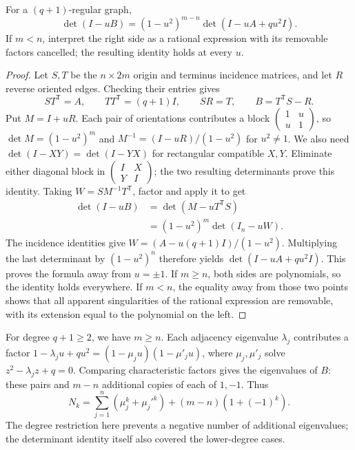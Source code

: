 \begin{theorem}\label{thm:bass}
For a $(q+1)$-regular graph,
\[
\det(I-uB)=(1-u^2)^{m-n}\det(I-uA+qu^2I).
\]
If $m<n$, interpret the right side as a rational expression with its removable factors cancelled; the resulting identity holds at every $u$.
\end{theorem}
\begin{proof}
Let $S,T$ be the $n\times2m$ origin and terminus incidence matrices, and let $R$ reverse oriented edges. Checking their entries gives
\[
ST^{\mathsf T}=A,\qquad TT^{\mathsf T}=(q+1)I,
\qquad SR=T,\qquad B=T^{\mathsf T}S-R.
\]
Put $M=I+uR$. Each pair of orientations contributes a block $\begin{pmatrix}1&u\\u&1\end{pmatrix}$, so $\det M=(1-u^2)^m$ and $M^{-1}=(I-uR)/(1-u^2)$ for $u^2\ne1$.
We also need $\det(I-XY)=\det(I-YX)$ for rectangular compatible $X,Y$. Eliminate either diagonal block in $\begin{pmatrix}I&X\\Y&I\end{pmatrix}$; the two resulting determinants prove this identity.
Taking $W=SM^{-1}T^{\mathsf T}$, factor and apply it to get
\[
\begin{aligned}
\det(I-uB)&=\det(M-uT^{\mathsf T}S)\\
&=(1-u^2)^m\det(I_n-uW).
\end{aligned}
\]
The incidence identities give $W=(A-u(q+1)I)/(1-u^2)$. Multiplying the last determinant by $(1-u^2)^n$ therefore yields $\det(I-uA+qu^2I)$. This proves the formula away from $u=\pm1$. If $m\ge n$, both sides are polynomials, so the identity holds everywhere. If $m<n$, the equality away from those two points shows that all apparent singularities of the rational expression are removable, with its extension equal to the polynomial on the left.
\end{proof}

For degree $q+1\ge2$, we have $m\ge n$. Each adjacency eigenvalue $\lambda_j$ contributes a factor
$1-\lambda_ju+qu^2=(1-\mu_ju)(1-\mu'_ju)$,
where $\mu_j,\mu'_j$ solve $z^2-\lambda_jz+q=0$. Comparing characteristic factors gives the eigenvalues of $B$: these pairs and $m-n$ additional copies of each of $1,-1$. Thus
\begin{equation}\label{eq:nkspec}
N_k=\sum_{j=1}^n(\mu_j^k+\mu_j'^k)+(m-n)(1+(-1)^k).
\end{equation}
The degree restriction here prevents a negative number of additional eigenvalues; the determinant identity itself also covered the lower-degree cases.

